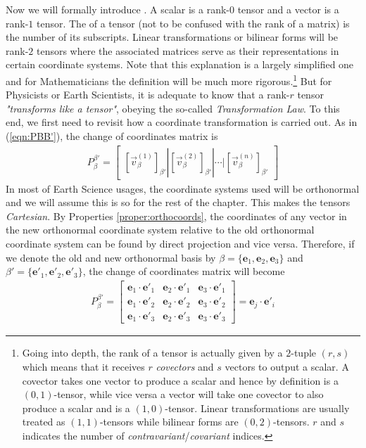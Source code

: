 Now we will formally introduce . A scalar is a rank-$0$ tensor and a vector is a rank-$1$ tensor. The  of a tensor (not to be confused with the rank of a matrix) is the number of its subscripts. Linear transformations or bilinear forms will be rank-$2$ tensors where the associated matrices serve as their representations in certain coordinate systems. Note that this explanation is a largely simplified one and for Mathematicians the definition will be much more rigorous.\footnote{\label{foot:rstensor}Going into depth, the rank of a tensor is actually given by a $2$-tuple $(r,s)$ which means that it receives $r$ \textit{covectors} and $s$ vectors to output a scalar. A covector takes one vector to produce a scalar and hence by definition is a $(0,1)$-tensor, while vice versa a vector will take one covector to also produce a scalar and is a $(1,0)$-tensor. Linear transformations are usually treated as $(1,1)$-tensors while bilinear forms are $(0,2)$-tensors. $r$ and $s$ indicates the number of \textit{contravariant}/\textit{covariant} indices.} But for Physicists or Earth Scientists, it is adequate to know that a rank-$r$ tensor \textit{"transforms like a tensor"}, obeying the so-called \textit{Transformation Law}. To this end, we first need to revisit how a coordinate transformation is carried out. As in (\ref{eqn:PBB'}), the change of coordinates matrix is
\begin{align}
P_\beta^{\beta'} = \begin{bmatrix}
[\vec{v}_\beta^{(1)}]_{\beta'} | [\vec{v}_\beta^{(2)}]_{\beta'} | \cdots | [\vec{v}_\beta^{(n)}]_{\beta'}
\end{bmatrix}
\end{align}
In most of Earth Science usages, the coordinate systems used will be orthonormal and we will assume this is so for the rest of the chapter. This makes the tensors \textit{Cartesian}. By Properties \ref{proper:orthocoords}, the coordinates of any vector in the new orthonormal coordinate system relative to the old orthonormal coordinate system can be found by direct projection and vice versa. Therefore, if we denote the old and new orthonormal basis by $\beta = \{\textbf{e}_1, \textbf{e}_2, \textbf{e}_3\}$ and $\beta'= \{\textbf{e}'_1, \textbf{e}'_2, \textbf{e}'_3\}$, the change of coordinates matrix will become
\begin{align}
P_\beta^{\beta'} = \begin{bmatrix}
\textbf{e}_1 \cdot \textbf{e}'_1 & \textbf{e}_2 \cdot \textbf{e}'_1 & \textbf{e}_3 \cdot \textbf{e}'_1 \\
\textbf{e}_1 \cdot \textbf{e}'_2 & \textbf{e}_2 \cdot \textbf{e}'_2 & \textbf{e}_3 \cdot \textbf{e}'_2 \\
\textbf{e}_1 \cdot \textbf{e}'_3 & \textbf{e}_2 \cdot \textbf{e}'_3 & \textbf{e}_3 \cdot \textbf{e}'_3 
\end{bmatrix}
= \textbf{e}_j \cdot \textbf{e}'_i
\label{eqn:Peeij}
\end{align}
